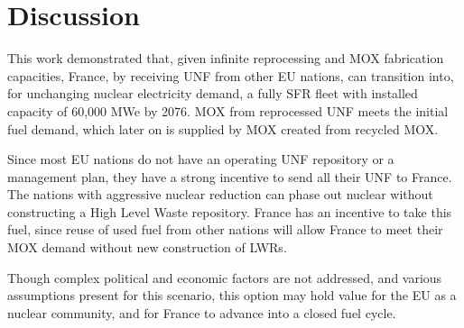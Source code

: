 \section{Discussion}
This work demonstrated that, given infinite
reprocessing and \gls{MOX} fabrication capacities,
France, by receiving \gls{UNF} from other \gls{EU} nations,
 can transition into, for unchanging nuclear electricity demand,
a fully \gls{SFR} fleet
with installed capacity of 60,000 MWe by 2076.
\gls{MOX} from reprocessed \gls{UNF} meets the initial fuel demand,
which later on is supplied by \gls{MOX} created from recycled \gls{MOX}.

Since most \gls{EU} nations do not have an operating \gls{UNF}
repository or a management plan, they have a strong incentive
to send all their \gls{UNF} to France. The nations
with aggressive nuclear reduction can phase out nuclear
without constructing a High Level Waste repository. France has an
incentive to take this fuel, since reuse of used fuel from
other nations will allow France to meet their MOX demand
without new construction of \glspl{LWR}.

Though complex political and economic factors are not
addressed, and various assumptions present for this scenario,
this option may hold value for the \gls{EU} as a nuclear community,
and for France to advance into a closed fuel cycle.
